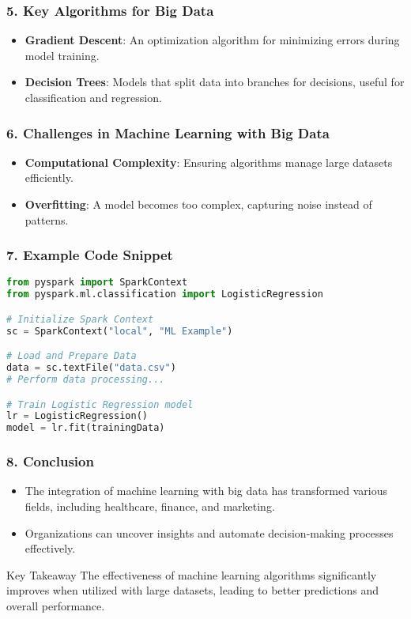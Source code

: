 \documentclass[aspectratio=169]{beamer}
\begin{document}
\begin{frame}[fragile]
    \frametitle{5. Key Algorithms for Big Data}
    \begin{itemize}
        \item \textbf{Gradient Descent}: An optimization algorithm for minimizing errors during model training.
        \item \textbf{Decision Trees}: Models that split data into branches for decisions, useful for classification and regression.
    \end{itemize}
\end{frame}

\begin{frame}[fragile]
    \frametitle{6. Challenges in Machine Learning with Big Data}
    \begin{itemize}
        \item \textbf{Computational Complexity}: Ensuring algorithms manage large datasets efficiently.
        \item \textbf{Overfitting}: A model becomes too complex, capturing noise instead of patterns.
    \end{itemize}
\end{frame}

\begin{frame}[fragile]
    \frametitle{7. Example Code Snippet}
    \begin{lstlisting}[language=Python]
from pyspark import SparkContext
from pyspark.ml.classification import LogisticRegression

# Initialize Spark Context
sc = SparkContext("local", "ML Example")

# Load and Prepare Data
data = sc.textFile("data.csv")
# Perform data processing...

# Train Logistic Regression model
lr = LogisticRegression()
model = lr.fit(trainingData)
    \end{lstlisting}
\end{frame}

\begin{frame}[fragile]
    \frametitle{8. Conclusion}
    \begin{itemize}
        \item The integration of machine learning with big data has transformed various fields, including healthcare, finance, and marketing.
        \item Organizations can uncover insights and automate decision-making processes effectively.
    \end{itemize}
    \begin{block}{Key Takeaway}
        The effectiveness of machine learning algorithms significantly improves when utilized with large datasets, leading to better predictions and overall performance.
    \end{block}
\end{frame}
\end{document}
